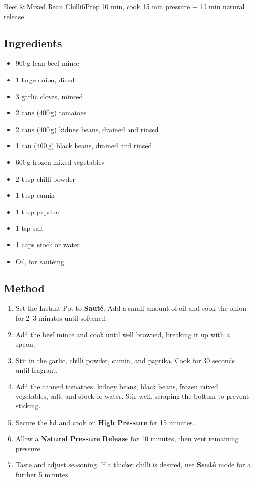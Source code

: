 \begin{recipebox}{Beef \& Mixed Bean Chilli}{6}{Prep 10 min, cook 15 min pressure + 10 min natural release}
\subsection*{Ingredients}
\begin{itemize}
    \item 900\,g lean beef mince
    \item 1 large onion, diced
    \item 3 garlic cloves, minced
    \item 2 cans (400\,g) tomatoes
    \item 2 cans (400\,g) kidney beans, drained and rinsed
    \item 1 can (400\,g) black beans, drained and rinsed
    \item 600\,g frozen mixed vegetables
    \item 2 tbsp chilli powder
    \item 1 tbsp cumin
    \item 1 tbsp paprika
    \item 1 tsp salt
    \item 1 cups stock or water
    \item Oil, for sautéing
\end{itemize}

\subsection*{Method}
\begin{enumerate}
    \item Set the Instant Pot to \textbf{Sauté}. Add a small amount of oil and cook the onion for 2--3 minutes until softened.
    \item Add the beef mince and cook until well browned, breaking it up with a spoon.
    \item Stir in the garlic, chilli powder, cumin, and paprika. Cook for 30 seconds until fragrant.
    \item Add the canned tomatoes, kidney beans, black beans, frozen mixed vegetables, salt, and stock or water. Stir well, scraping the bottom to prevent sticking.
    \item Secure the lid and cook on \textbf{High Pressure} for 15 minutes.
    \item Allow a \textbf{Natural Pressure Release} for 10 minutes, then vent remaining pressure.
    \item Taste and adjust seasoning. If a thicker chilli is desired, use \textbf{Sauté} mode for a further 5 minutes.
\end{enumerate}


\end{recipebox}
